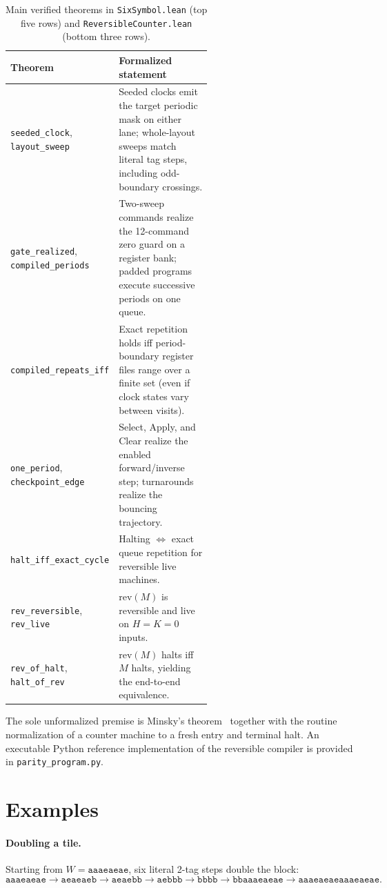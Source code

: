 \documentclass{article}
\theoremstyle{definition}
\theoremstyle{remark}
\newcommand{\ttw}[1]{\texttt{#1}}
\begin{document}
\begin{table}[h]
\centering
\begin{tabular}{@{}lp{0.58\linewidth}@{}}
\toprule
Theorem & Formalized statement \\
\midrule
\ttw{seeded\_clock}, \ttw{layout\_sweep} & Seeded clocks emit the target periodic mask on either lane; whole-layout sweeps match literal tag steps, including odd-boundary crossings. \\
\ttw{gate\_realized}, \ttw{compiled\_periods} & Two-sweep commands realize the 12-command zero guard on a register bank; padded programs execute successive periods on one queue. \\
\ttw{compiled\_repeats\_iff} & Exact repetition holds iff period-boundary register files range over a finite set (even if clock states vary between visits). \\
\ttw{one\_period}, \ttw{checkpoint\_edge} & Select, Apply, and Clear realize the enabled forward/inverse step; turnarounds realize the bouncing trajectory. \\
\ttw{halt\_iff\_exact\_cycle} & Halting $\iff$ exact queue repetition for reversible live machines. \\
\ttw{rev\_reversible}, \ttw{rev\_live} & $\mathrm{rev}(M)$ is reversible and live on $H=K=0$ inputs. \\
\ttw{rev\_of\_halt}, \ttw{halt\_of\_rev} & $\mathrm{rev}(M)$ halts iff $M$ halts, yielding the end-to-end equivalence. \\
\bottomrule
\end{tabular}
\caption{Main verified theorems in \ttw{SixSymbol.lean} (top five rows) and \ttw{ReversibleCounter.lean} (bottom three rows).}
\label{tab:lean}
\end{table}

The sole unformalized premise is Minsky's theorem~\cite{Minsky1967} together with the routine normalization of a counter machine to a fresh entry and terminal halt.
An executable Python reference implementation of the reversible compiler is provided in \ttw{parity\_program.py}.

\section{Examples}

\paragraph{Doubling a tile.}
Starting from $W = \ttw{aaaeaeae}$, six literal 2-tag steps double the block:
\[
\ttw{aaaeaeae} \to \ttw{aeaeaeb} \to \ttw{aeaebb} \to \ttw{aebbb} \to \ttw{bbbb}
\to \ttw{bbaaaeaeae} \to \ttw{aaaeaeaeaaaeaeae}.
\]
\end{document}

